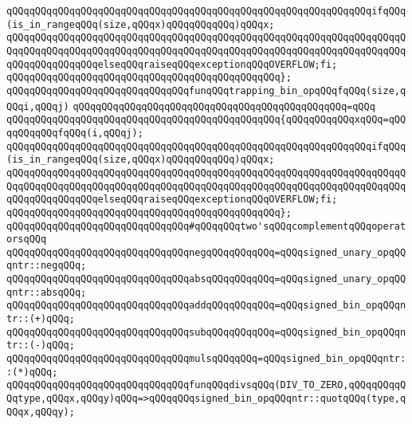 \newline
\verb|qQQqqQQqqQQqqQQqqQQqqQQqqQQqqQQqqQQqqQQqqQQqqQQqqQQqqQQqqQQqqQQqifqQQq(is_in_rangeqQQq(size,qQQqx)qQQqqQQqqQQq)qQQqx;|\newline
\verb|qQQqqQQqqQQqqQQqqQQqqQQqqQQqqQQqqQQqqQQqqQQqqQQqqQQqqQQqqQQqqQQqqQQqqQQqqQQqqQQqqQQqqQQqqQQqqQQqqQQqqQQqqQQqqQQqqQQqqQQqqQQqqQQqqQQqqQQqqQQqqQQqqQQqqQQqqQQqelseqQQqraiseqQQqexceptionqQQqOVERFLOW;fi;|\newline
\verb|qQQqqQQqqQQqqQQqqQQqqQQqqQQqqQQqqQQqqQQqqQQqqQQq};|\newline
\newline
\verb|qQQqqQQqqQQqqQQqqQQqqQQqqQQqqQQqfunqQQqtrapping_bin_opqQQqfqQQq(size,qQQqi,qQQqj)|\newline
\verb|qQQqqQQqqQQqqQQqqQQqqQQqqQQqqQQqqQQqqQQqqQQqqQQq=qQQq|\newline
\verb|qQQqqQQqqQQqqQQqqQQqqQQqqQQqqQQqqQQqqQQqqQQqqQQq{qQQqqQQqqQQqxqQQq=qQQqqQQqqQQqfqQQq(i,qQQqj);|\newline
\newline
\verb|qQQqqQQqqQQqqQQqqQQqqQQqqQQqqQQqqQQqqQQqqQQqqQQqqQQqqQQqqQQqqQQqifqQQq(is_in_rangeqQQq(size,qQQqx)qQQqqQQqqQQq)qQQqx;|\newline
\verb|qQQqqQQqqQQqqQQqqQQqqQQqqQQqqQQqqQQqqQQqqQQqqQQqqQQqqQQqqQQqqQQqqQQqqQQqqQQqqQQqqQQqqQQqqQQqqQQqqQQqqQQqqQQqqQQqqQQqqQQqqQQqqQQqqQQqqQQqqQQqqQQqqQQqqQQqqQQqelseqQQqraiseqQQqexceptionqQQqOVERFLOW;fi;|\newline
\verb|qQQqqQQqqQQqqQQqqQQqqQQqqQQqqQQqqQQqqQQqqQQqqQQq};|\newline
\newline
\verb|qQQqqQQqqQQqqQQqqQQqqQQqqQQqqQQq#qQQqqQQqtwo'sqQQqcomplementqQQqoperatorsqQQq|\newline
\newline
\verb|qQQqqQQqqQQqqQQqqQQqqQQqqQQqqQQqnegqQQqqQQqqQQq=qQQqsigned_unary_opqQQqntr::negqQQq;|\newline
\verb|qQQqqQQqqQQqqQQqqQQqqQQqqQQqqQQqabsqQQqqQQqqQQq=qQQqsigned_unary_opqQQqntr::absqQQq;|\newline
\verb|qQQqqQQqqQQqqQQqqQQqqQQqqQQqqQQqaddqQQqqQQqqQQq=qQQqsigned_bin_opqQQqntr::(+)qQQq;|\newline
\verb|qQQqqQQqqQQqqQQqqQQqqQQqqQQqqQQqsubqQQqqQQqqQQq=qQQqsigned_bin_opqQQqntr::(-)qQQq;|\newline
\verb|qQQqqQQqqQQqqQQqqQQqqQQqqQQqqQQqmulsqQQqqQQq=qQQqsigned_bin_opqQQqntr::(*)qQQq;|\newline
\newline
\verb|qQQqqQQqqQQqqQQqqQQqqQQqqQQqqQQqfunqQQqdivsqQQq(DIV_TO_ZERO,qQQqqQQqqQQqtype,qQQqx,qQQqy)qQQq=>qQQqqQQqsigned_bin_opqQQqntr::quotqQQq(type,qQQqx,qQQqy);|\newline
